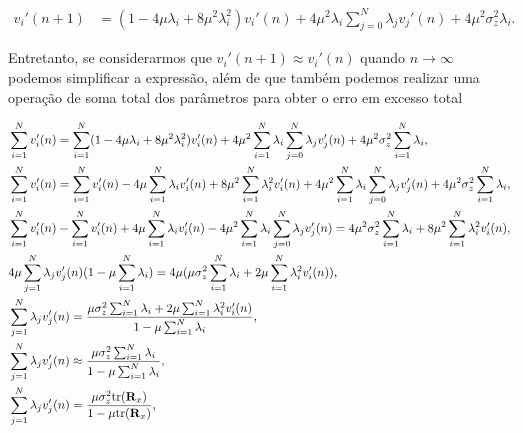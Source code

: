 \begin{enumerate}
        \begin{align}
            v_{i}'(n + 1) &= (1 - 4 \mu \lambda_{i} + 8 \mu^{2} \lambda^{2}_{i}) v_{i}'(n) + 4 \mu^{2} \lambda_{i} \sum^{N}_{j = 0} \lambda_{j} v_{j}'(n) + 4 \mu^{2} \sigma^{2}_{z} \lambda_{i}.
        \end{align}

        Entretanto, se considerarmos que $v_{i}'(n + 1) \approx v_{i}'(n)$ quando $n \rightarrow \infty$ podemos simplificar a expressão, além de que 
        também podemos realizar uma operação de soma total dos parâmetros para obter o erro em excesso total

        \begin{align}
            \notag &\sum^{N}_{i = 1} v_{i}'(n) = \sum^{N}_{i = 1} (1 - 4 \mu \lambda_{i} + 8 \mu^{2} \lambda^{2}_{i}) v_{i}'(n) + 4 \mu^{2} \sum^{N}_{i = 1} \lambda_{i} \sum^{N}_{j = 0} \lambda_{j} v_{j}'(n) + 4 \mu^{2} \sigma^{2}_{z} \sum^{N}_{i = 1} \lambda_{i}, \\
            \notag &\sum^{N}_{i = 1} v_{i}'(n) = \sum^{N}_{i = 1} v_{i}'(n) - 4 \mu \sum^{N}_{i = 1} \lambda_{i} v_{i}'(n)  + 8 \mu^{2} \sum^{N}_{i = 1} \lambda^{2}_{i} v_{i}'(n) + 4 \mu^{2} \sum^{N}_{i = 1} \lambda_{i} \sum^{N}_{j = 0} \lambda_{j} v_{j}'(n) + 4 \mu^{2} \sigma^{2}_{z} \sum^{N}_{i = 1} \lambda_{i}, \\
            \notag &\sum^{N}_{i = 1} v_{i}'(n) - \sum^{N}_{i = 1} v_{i}'(n) + 4 \mu \sum^{N}_{i = 1} \lambda_{i} v_{i}'(n) - 4 \mu^{2} \sum^{N}_{i = 1} \lambda_{i} \sum^{N}_{j = 0} \lambda_{j} v_{j}'(n) = 4 \mu^{2} \sigma^{2}_{z} \sum^{N}_{i = 1} \lambda_{i} + 8 \mu^{2} \sum^{N}_{i = 1} \lambda^{2}_{i} v_{i}'(n), \\
            \notag &4 \mu \sum^{N}_{j = 1} \lambda_{j} v_{j}'(n)(1 - \mu \sum^{N}_{i = 1} \lambda_{i}) = 4 \mu (\mu \sigma^{2}_{z} \sum^{N}_{i = 1} \lambda_{i} + 2 \mu \sum^{N}_{i = 1} \lambda^{2}_{i} v_{i}'(n)), \\
            \notag &\sum^{N}_{j = 1} \lambda_{j} v_{j}'(n) = \frac{\mu \sigma^{2}_{z} \sum^{N}_{i = 1} \lambda_{i} + 2 \mu \sum^{N}_{i = 1} \lambda^{2}_{i} v_{i}'(n)}{1 - \mu \sum^{N}_{i = 1} \lambda_{i}}, \\
            \notag &\sum^{N}_{j = 1} \lambda_{j} v_{j}'(n) \approx \frac{\mu \sigma^{2}_{z} \sum^{N}_{i = 1} \lambda_{i} }{1 - \mu \sum^{N}_{i = 1} \lambda_{i}}, \\
            &\sum^{N}_{j = 1} \lambda_{j} v_{j}'(n) = \frac{\mu \sigma^{2}_{z} \text{tr}(\mathbf{R}_{x})}{1 - \mu \text{tr}(\mathbf{R}_{x})},
        \end{align}


\end{enumerate}
